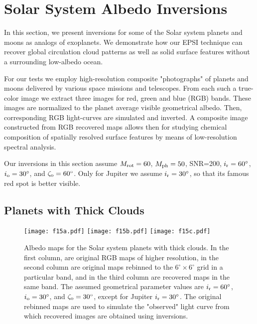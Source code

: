 \documentclass{emulateapj}
\begin{document}
\section{Solar System Albedo Inversions}\label{sec:solsys}

In this section, we present inversions for some of the Solar system 
planets and moons as analogs of exoplanets. We demonstrate how our EPSI technique can recover 
global circulation cloud patterns as well as solid surface features without a surrounding 
low-albedo ocean. 

For our tests we employ high-resolution composite "photographs" of planets 
and moons delivered by various space missions and telescopes. 
From each such a true-color image we extract three images for red, green and blue 
(RGB) bands. These images are normalized to the planet average visible geometrical 
albedo. Then, corresponding RGB light-curves are simulated and inverted.
A composite image constructed from RGB recovered maps allows then for
studying chemical composition of spatially resolved surface features by 
means of low-resolution spectral analysis.

Our inversions in this section assume $M_{\rm rot}=60$, $M_{\rm ph}=50$, SNR=200, 
$i_{\rm r}=60^\circ$, $i_{\rm o}=30^\circ$, and $\zeta_{\rm o}=60^\circ$.
Only for Jupiter we assume $i_{\rm r}=30^\circ$, so that its famous red spot
is better visible.

\subsection{Planets with Thick Clouds }\label{sec:inve_solsys_clouds}

\begin{figure*}
\centering
\texttt{[image: f15a.pdf]}
\texttt{[image: f15b.pdf]}
\texttt{[image: f15c.pdf]}
\caption{Albedo maps for the Solar system planets with thick clouds. 
In the first column, are original RGB maps of higher resolution,
in the second column are original maps rebinned to the $6^\circ\times6^\circ$ grid in a particular band,
and in the third column are recovered maps in the same band. 
The assumed geometrical parameter values are  
$i_{\rm r}=60^\circ$, $i_{\rm o}=30^\circ$, and $\zeta_{\rm o}=30^\circ$,
except for Jupiter $i_{\rm r}=30^\circ$.
The original rebinned maps are used to simulate the "observed" light curve from
which recovered images are obtained using inversions.
}
\label{fig:solsys_cloud}
\end{figure*}
\end{document}
